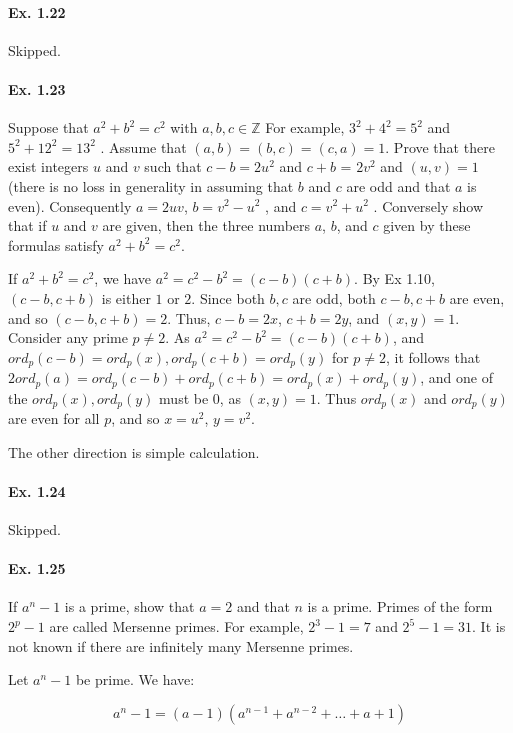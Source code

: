 \documentclass[notitlepage]{article}
\theoremstyle{definition}
\newcommand\Z{\mathbb{Z}}
\begin{document}
\paragraph{Ex. 1.22} Skipped.

\paragraph{Ex. 1.23} 
Suppose that $a^2 + b^2 = c^2$ with $a, b, c \in \Z$ For example, $3^2 + 4^2 = 5^2$ and $5^2 +
12^2 = 13^2$ . Assume that $(a, b) = (b, c) = (c, a) = 1$. Prove that there exist integers $u$
and $v$ such that $c - b = 2u^2$ and $c + b$ = $2v^2$ and $(u, v) = 1$ (there is no loss in
generality in assuming that $b$ and $c$ are odd and that $a$ is even). Consequently $a = 2uv$,
$b = v^2 - u^2$ , and $c = v^2 + u^2$ . Conversely show that if $u$ and $v$ are given, then the
three numbers $a$, $b$, and $c$ given by these formulas satisfy $a^2 + b^2 = c^2$.

If $a^2 + b^2 = c^2$, we have $a^2 = c^2 - b^2 = (c-b)(c+b)$. By Ex
1.10, $(c-b, c+b)$ is either $1$ or $2$. Since both $b, c$ are odd,
both $c-b, c+b$ are even, and so $(c-b, c+b) = 2$. Thus, $c-b = 2x$,
$c+b = 2y$, and $(x, y) = 1$. Consider any prime $p \ne 2$. As $a^2 =
c^2 - b^2 = (c-b)(c+b)$, and $ord_p(c-b) = ord_p(x), ord_p(c+b) =
ord_p(y)$ for $p \ne 2$, it follows that $2 ord_p(a) = ord_p(c-b) +
ord_p(c+b) = ord_p(x) + ord_p(y)$, and one of the $ord_p(x), ord_p(y)$
must be $0$, as $(x, y) = 1$. Thus $ord_p(x)$ and $ord_p(y)$ are even
for all $p$, and so $x = u^2$, $y = v^2$.

The other direction is simple calculation.

\paragraph{Ex. 1.24} Skipped.

\paragraph{Ex. 1.25}
If $a^n - 1$ is a prime, show that $a = 2$ and that $n$ is a
prime. Primes of the form $2^p - 1$ are called Mersenne primes. For
example, $2^3 - 1 = 7$ and $2^5 - 1 = 31$. It is not known if there are
infinitely many Mersenne primes.

Let $a^n - 1$ be prime. We have:

\begin{equation}
  a^n - 1 = (a-1)(a^{n-1} + a^{n-2} + \ldots + a + 1)
\end{equation}
\end{document}
